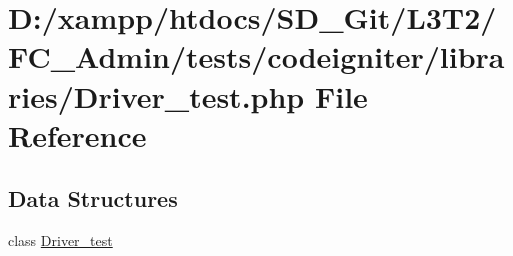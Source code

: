 \hypertarget{_admin_2tests_2codeigniter_2libraries_2_driver__test_8php}{}\section{D\+:/xampp/htdocs/\+S\+D\+\_\+\+Git/\+L3\+T2/\+F\+C\+\_\+\+Admin/tests/codeigniter/libraries/\+Driver\+\_\+test.php File Reference}
\label{_admin_2tests_2codeigniter_2libraries_2_driver__test_8php}
\subsection*{Data Structures}
\begin{DoxyCompactItemize}
\item 
class \hyperlink{class_driver__test}{Driver\+\_\+test}
\end{DoxyCompactItemize}

